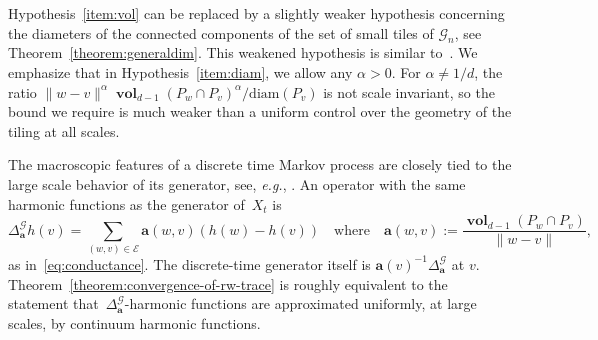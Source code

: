 \documentclass[12pt]{amsart}
\numberwithin{equation}{section}
\newcommand{\eg}{{\it e.g.}}
\newcommand{\G}{\mathcal{G}}
\newcommand{\E}{\mathcal{E}}
\newcommand{\aDelta}{\hyperref[eq:geometric-laplacian]{{\Delta^{\mathcal{G}}_{\cond}}}}
\newcommand{\cond}{\hyperref[eq:geometric-laplacian]{\mathbf{a}}}
\DeclareMathOperator{\vol}{\mathbf{vol}}
\begin{document}
Hypothesis~\ref{item:vol} can be replaced by a slightly weaker hypothesis concerning the diameters of the connected components of the set of small tiles of $\G_n$, see Theorem~\ref{theorem:generaldim}. This weakened hypothesis is similar to~\cite[Assumption 1.2]{CLM}. We emphasize that in Hypothesis~\ref{item:diam}, we allow any $\alpha > 0$. For $\alpha \not=1/d$, the ratio $\|w-v\|^{\alpha} \vol_{d-1}(P_w \cap P_v)^{\alpha} / \mathrm{diam}(P_v)$ is not scale invariant, so the bound we require is much weaker than a uniform control over the geometry of the tiling at all scales. 
 \smallskip

The macroscopic features of a discrete time Markov process are closely tied to the large scale behavior of its generator, see, \eg, \cite[Theorem 19.25]{MR4226142}. 
An operator with the same harmonic functions as the generator of~$X_t$ is
\begin{equation}
	\label{eq:geometric-laplacian}
	\aDelta h(v) = \sum_{(w,v) \in \E}  \cond(w,v)( h(w) - h(v))
	\quad \mbox{where}  \quad 	\cond(w,v) :=  \frac{\vol_{d-1}(P_w \cap P_v)}{\|w - v\| } , \, 
\end{equation}
as in~\eqref{eq:conductance}. The discrete-time generator itself is $\cond(v)^{-1}\aDelta$ at $v$.
Theorem~\ref{theorem:convergence-of-rw-trace} is roughly equivalent to the statement that~$\aDelta$-harmonic functions are approximated uniformly, at large scales, by continuum harmonic functions. 
\end{document}
